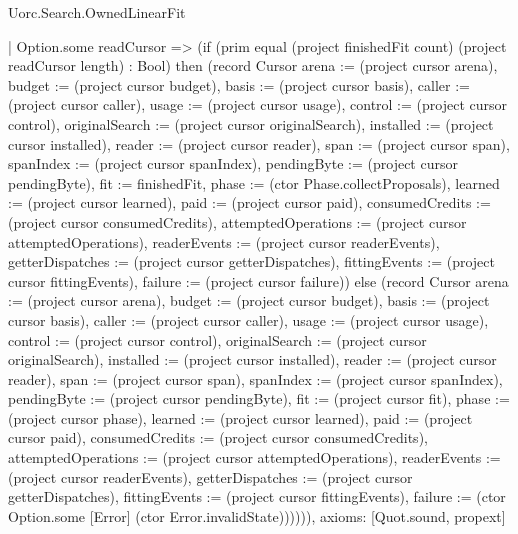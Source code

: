 \begin{lexlean}{Uorc.Search.OwnedLinearFit}
\begin{semanticmodule}
{      | Option.some readCursor => (if (prim equal (project finishedFit count) (project readCursor length) : Bool) then (record Cursor {arena := (project cursor arena), budget := (project cursor budget), basis := (project cursor basis), caller := (project cursor caller), usage := (project cursor usage), control := (project cursor control), originalSearch := (project cursor originalSearch), installed := (project cursor installed), reader := (project cursor reader), span := (project cursor span), spanIndex := (project cursor spanIndex), pendingByte := (project cursor pendingByte), fit := finishedFit, phase := (ctor Phase.collectProposals), learned := (project cursor learned), paid := (project cursor paid), consumedCredits := (project cursor consumedCredits), attemptedOperations := (project cursor attemptedOperations), readerEvents := (project cursor readerEvents), getterDispatches := (project cursor getterDispatches), fittingEvents := (project cursor fittingEvents), failure := (project cursor failure)}) else (record Cursor {arena := (project cursor arena), budget := (project cursor budget), basis := (project cursor basis), caller := (project cursor caller), usage := (project cursor usage), control := (project cursor control), originalSearch := (project cursor originalSearch), installed := (project cursor installed), reader := (project cursor reader), span := (project cursor span), spanIndex := (project cursor spanIndex), pendingByte := (project cursor pendingByte), fit := (project cursor fit), phase := (project cursor phase), learned := (project cursor learned), paid := (project cursor paid), consumedCredits := (project cursor consumedCredits), attemptedOperations := (project cursor attemptedOperations), readerEvents := (project cursor readerEvents), getterDispatches := (project cursor getterDispatches), fittingEvents := (project cursor fittingEvents), failure := (ctor Option.some [Error] (ctor Error.invalidState))})))),
  axioms: [Quot.sound, propext]
}


\end{semanticmodule}
\end{lexlean}
